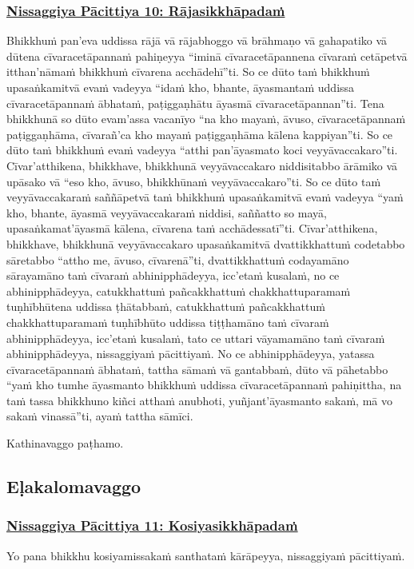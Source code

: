 \subsubsection*{\hyperref[forf-exp10]{Nissaggiya Pācittiya 10: Rājasikkhāpadaṁ}}
\label{np10}
Bhikkhuṁ pan'eva uddissa rājā vā rājabhoggo vā brāhmaṇo vā gahapatiko vā dūtena cīvaracetāpannaṁ pahiṇeyya “iminā cīvaracetāpannena cīvaraṁ cetāpetvā itthan'nāmaṁ bhikkhuṁ cīvarena acchādehī”ti. So ce dūto taṁ bhikkhuṁ upasaṅkamitvā evaṁ vadeyya “idaṁ kho, bhante, āyasmantaṁ uddissa cīvaracetāpannaṁ ābhataṁ, paṭiggaṇhātu āyasmā cīvaracetāpannan''ti. Tena bhikkhunā so dūto evam'assa vacanīyo “na kho mayaṁ, āvuso, cīvaracetāpannaṁ paṭiggaṇhāma, cīvarañ'ca kho mayaṁ paṭiggaṇhāma kālena kappiyan''ti. So ce dūto taṁ bhikkhuṁ evaṁ vadeyya “atthi pan'āyasmato koci veyyāvaccakaro”ti. Cīvar'atthikena, bhikkhave, bhikkhunā veyyāvaccakaro niddisitabbo ārāmiko vā upāsako vā “eso kho, āvuso, bhikkhūnaṁ veyyāvaccakaro”ti. So ce dūto taṁ veyyāvaccakaraṁ saññāpetvā taṁ bhikkhuṁ upasaṅkamitvā evaṁ vadeyya “yaṁ kho, bhante, āyasmā veyyāvaccakaraṁ niddisi, saññatto so mayā, upasaṅkamat'āyasmā kālena, cīvarena taṁ acchādessatī”ti. Cīvar'atthikena, bhikkhave, bhikkhunā veyyāvaccakaro upasaṅkamitvā dvattikkhattuṁ codetabbo sāretabbo “attho me, āvuso, cīvarenā”ti, dvattikkhattuṁ codayamāno sārayamāno taṁ cīvaraṁ abhinipphādeyya, icc'etaṁ kusalaṁ, no ce abhinipphādeyya, catukkhattuṁ pañcakkhattuṁ chakkhattuparamaṁ tuṇhībhūtena uddissa ṭhātabbaṁ, catukkhattuṁ pañcakkhattuṁ chakkhattuparamaṁ tuṇhībhūto uddissa tiṭṭhamāno taṁ cīvaraṁ abhinipphādeyya, icc'etaṁ kusalaṁ, tato ce uttari vāyamamāno taṁ cīvaraṁ abhinipphādeyya, nissaggiyaṁ pācittiyaṁ. No ce abhinipphādeyya, yatassa cīvaracetāpannaṁ ābhataṁ, tattha sāmaṁ vā gantabbaṁ, dūto vā pāhetabbo “yaṁ kho tumhe āyasmanto bhikkhuṁ uddissa cīvaracetāpannaṁ pahiṇittha, na taṁ tassa bhikkhuno kiñci atthaṁ anubhoti, yuñjant'āyasmanto sakaṁ, mā vo sakaṁ vinassā”ti, ayaṁ tattha sāmīci.

\begin{center}
  Kathinavaggo paṭhamo.
\end{center}

\subsection{Eḷakalomavaggo}
\vspace{0.2cm}

\subsubsection*{\hyperref[forf-exp11]{Nissaggiya Pācittiya 11: Kosiyasikkhāpadaṁ}}
\label{np11}
Yo pana bhikkhu kosiyamissakaṁ santhataṁ kārāpeyya, nissaggiyaṁ pācittiyaṁ.

